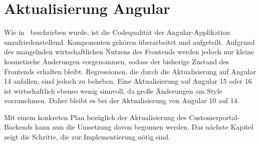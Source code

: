 \section{Aktualisierung Angular}

Wie in~ beschrieben wurde, ist die Codequalität der Angular-Applikation unzufriedenstellend. Komponenten gehören überarbeitet und aufgeteilt. Aufgrund des mangelnden wirtschaftlichen Nutzens des Frontends werden jedoch nur kleine kosmetische Änderungen vorgenommen, sodass der bisherige Zustand des Frontends erhalten bleibt. Regressionen, die durch die Aktualisierung auf Angular 14 anfallen, sind jedoch zu beheben. Eine Aktualisierung auf Angular 15 oder 16 ist wirtschaftlich ebenso wenig sinnvoll, da große Änderungen am Style vorzunehmen. Daher bleibt es bei der Aktualisierung von Angular 10 auf 14.

Mit einem konkreten Plan bezüglich der Aktualisierung des Customerportal-Backends kann nun die Umsetzung davon begonnen werden. Das nächste Kapitel zeigt die Schritte, die zur Implementierung nötig sind.